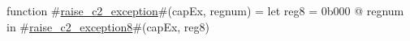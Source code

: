 function #\hyperref[zraisezyc2zyexception]{raise\_c2\_exception}#(capEx, regnum) =
  let reg8 = 0b000 @ regnum in
  #\hyperref[zraisezyc2zyexception8]{raise\_c2\_exception8}#(capEx, reg8)
